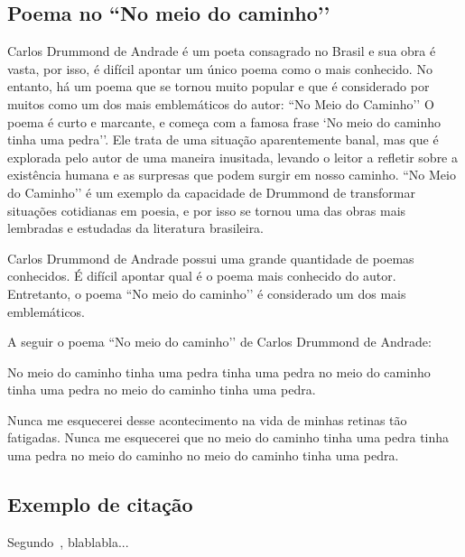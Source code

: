 \documentclass[12pt, openright,	oneside, a4paper, english, french, spanish, brazil]{abntex2}
\begin{document}
\subsection{Poema no ``No meio do caminho’’}
Carlos Drummond de Andrade é um poeta consagrado no Brasil e sua obra é vasta, por isso, é difícil
apontar um único poema como o mais conhecido. No entanto, há um poema que se tornou muito popular
e que é considerado por muitos como um dos mais emblemáticos do autor: ``No Meio do Caminho’’
O poema é curto e marcante, e começa com a famosa frase `No meio do caminho tinha uma pedra’’. Ele
trata de uma situação aparentemente banal, mas que é explorada pelo autor de uma maneira inusitada,
levando o leitor a refletir sobre a existência humana e as surpresas que podem surgir em nosso caminho.
``No Meio do Caminho’’ é um exemplo da capacidade de Drummond de transformar situações cotidianas
em poesia, e por isso se tornou uma das obras mais lembradas e estudadas da literatura brasileira.

Carlos Drummond de Andrade possui uma grande quantidade de poemas conhecidos. É difícil apontar
qual é o poema mais conhecido do autor. Entretanto, o poema ``No meio do caminho’’ é considerado um
dos mais emblemáticos.

A seguir o poema ``No meio do caminho’’ de Carlos Drummond de Andrade:
\begin{citacao}
No meio do caminho tinha uma pedra
tinha uma pedra no meio do caminho
tinha uma pedra
no meio do caminho tinha uma pedra.

Nunca me esquecerei desse acontecimento
na vida de minhas retinas tão fatigadas.
Nunca me esquecerei que no meio do caminho
tinha uma pedra
tinha uma pedra no meio do caminho
no meio do caminho tinha uma pedra.~\cite{foto-carlos-drummond}
\end{citacao}

\subsection{Exemplo de citação}
Segundo~, blablabla...



\postextual


\end{document}
